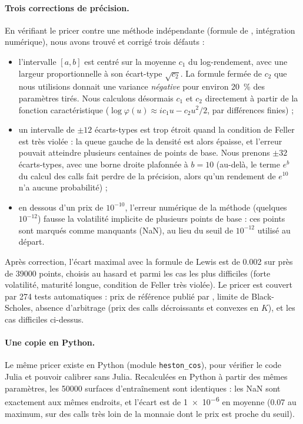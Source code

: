 \paragraph{Trois corrections de précision.} En vérifiant le pricer contre une méthode indépendante (formule de
\citet{lewis2000}, intégration numérique), nous avons trouvé et corrigé trois défauts :
\begin{itemize}
  \item l'intervalle $[a,b]$ est centré sur la moyenne $c_1$ du log-rendement, avec une largeur proportionnelle à
  son écart-type $\sqrt{c_2}$. La formule fermée de $c_2$ que nous utilisions donnait une variance
  \emph{négative} pour environ \SI{20}{\percent} des paramètres tirés. Nous calculons désormais $c_1$ et $c_2$
  directement à partir de la fonction caractéristique ($\log\varphi(u) \approx i c_1 u - c_2 u^2/2$, par
  différences finies) ;
  \item un intervalle de $\pm 12$ écarts-types est trop étroit quand la condition de Feller est très violée : la
  queue gauche de la densité est alors épaisse, et l'erreur pouvait atteindre plusieurs centaines de points de
  base. Nous prenons $\pm 32$ écarts-types, avec une borne droite plafonnée à $b = 10$ (au-delà, le terme $e^{b}$
  du calcul des calls fait perdre de la précision, alors qu'un rendement de $e^{10}$ n'a aucune probabilité) ;
  \item en dessous d'un prix de $10^{-10}$, l'erreur numérique de la méthode (quelques $10^{-12}$) fausse la
  volatilité implicite de plusieurs points de base : ces points sont marqués comme manquants (NaN), au lieu du
  seuil de $10^{-12}$ utilisé au départ.
\end{itemize}
Après correction, l'écart maximal avec la formule de Lewis est de \SI{0.002}{\pb} sur près de \num{39000} points,
choisis au hasard et parmi les cas les plus difficiles (forte volatilité, maturité longue, condition de Feller très
violée). Le pricer est couvert par \num{274} tests automatiques : prix de référence publié par \citet{fang2008},
limite de Black-Scholes, absence d'arbitrage (prix des calls décroissants et convexes en $K$), et les cas
difficiles ci-dessus.

\paragraph{Une copie en Python.} Le même pricer existe en Python (module \texttt{heston\_cos}), pour vérifier
le code Julia et pouvoir calibrer sans Julia. Recalculées en Python à partir des mêmes paramètres,
les \num{50000} surfaces d'entraînement sont identiques : les NaN sont exactement aux mêmes endroits, et l'écart
est de \SI{1e-6}{\pb} en moyenne (\SI{0.07}{\pb} au maximum, sur des calls très loin de la monnaie dont le prix est
proche du seuil).

